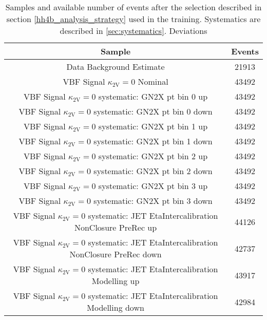 \begin{table}[]
    \centering
    \caption{Samples and available number of events after the selection described in section \ref{hh4b_analysis_strategy} used in the training. Systematics are described in \ref{sec:systematics}. Deviations }
    \begin{tabular}{cc}
        \hline
        Sample                                                                                         & Events \\ \hline 
        Data Background Estimate                                                                       & 21913   \\ \hline
        VBF Signal $\kappa_\mathrm{2V}=0$ Nominal                                                      & 43492  \\
        VBF Signal $\kappa_\mathrm{2V}=0$ systematic: GN2X pt bin 0 up                                 & 43492  \\
        VBF Signal $\kappa_\mathrm{2V}=0$ systematic: GN2X pt bin 0 down                               & 43492  \\
        VBF Signal $\kappa_\mathrm{2V}=0$ systematic: GN2X pt bin 1 up                                 & 43492  \\
        VBF Signal $\kappa_\mathrm{2V}=0$ systematic: GN2X pt bin 1 down                               & 43492  \\
        VBF Signal $\kappa_\mathrm{2V}=0$ systematic: GN2X pt bin 2 up                                 & 43492  \\
        VBF Signal $\kappa_\mathrm{2V}=0$ systematic: GN2X pt bin 2 down                               & 43492  \\
        VBF Signal $\kappa_\mathrm{2V}=0$ systematic: GN2X pt bin 3 up                                 & 43492  \\
        VBF Signal $\kappa_\mathrm{2V}=0$ systematic: GN2X pt bin 3 down                               & 43492  \\
        VBF Signal $\kappa_\mathrm{2V}=0$ systematic: JET EtaIntercalibration NonClosure PreRec up     & 44126  \\
        VBF Signal $\kappa_\mathrm{2V}=0$ systematic: JET EtaIntercalibration NonClosure PreRec down   & 42737  \\
        VBF Signal $\kappa_\mathrm{2V}=0$ systematic: JET EtaIntercalibration Modelling up             & 43917  \\
        VBF Signal $\kappa_\mathrm{2V}=0$ systematic: JET EtaIntercalibration Modelling down           & 42984  \\

\end{tabular}
\end{table}
